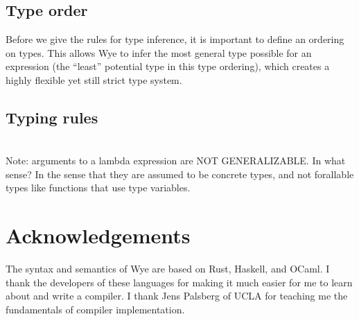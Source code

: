 \documentclass[a4paper, 12pt]{article}
\begin{document}
\subsection{Type order}

Before we give the rules for type inference, it is important to define an ordering on types. This allows Wye to infer the most general type possible for an expression (the ``least'' potential type in this type ordering), which creates a highly flexible yet still strict type system.

\subsection{Typing rules}

\begin{align*}
\end{align*}

Note: arguments to a lambda expression are NOT GENERALIZABLE. In what sense? In the sense that they are assumed to be concrete types, and not forallable types like functions that use type variables.


\pagebreak
\section{Acknowledgements}
The syntax and semantics of Wye are based on Rust, Haskell, and OCaml. I thank the developers of these languages for making it much easier for me to learn about and write a compiler. I thank Jens Palsberg of UCLA for teaching me the fundamentals of compiler implementation.

\pagebreak



\end{document}
